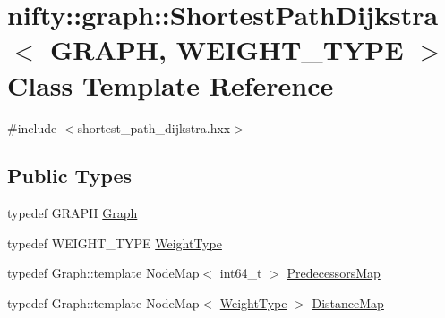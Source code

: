 \hypertarget{classnifty_1_1graph_1_1ShortestPathDijkstra}{}\section{nifty\+:\+:graph\+:\+:Shortest\+Path\+Dijkstra$<$ G\+R\+A\+P\+H, W\+E\+I\+G\+H\+T\+\_\+\+T\+Y\+P\+E $>$ Class Template Reference}
\label{classnifty_1_1graph_1_1ShortestPathDijkstra}


{\ttfamily \#include $<$shortest\+\_\+path\+\_\+dijkstra.\+hxx$>$}

\subsection*{Public Types}
\begin{DoxyCompactItemize}
\item 
typedef G\+R\+A\+P\+H \hyperlink{classnifty_1_1graph_1_1ShortestPathDijkstra_abf7e8e078818d19f973eebe1784f6716}{Graph}
\item 
typedef W\+E\+I\+G\+H\+T\+\_\+\+T\+Y\+P\+E \hyperlink{classnifty_1_1graph_1_1ShortestPathDijkstra_a99783a7c717b74f48226852d73844fed}{Weight\+Type}
\item 
typedef Graph\+::template Node\+Map$<$ int64\+\_\+t $>$ \hyperlink{classnifty_1_1graph_1_1ShortestPathDijkstra_a61f6bc245259c631182b51c3eb34785b}{Predecessors\+Map}
\item 
typedef Graph\+::template Node\+Map$<$ \hyperlink{classnifty_1_1graph_1_1ShortestPathDijkstra_a99783a7c717b74f48226852d73844fed}{Weight\+Type} $>$ \hyperlink{classnifty_1_1graph_1_1ShortestPathDijkstra_a87e51b119ce8d43b03c913527ff3a4c9}{Distance\+Map}
\end{DoxyCompactItemize}
